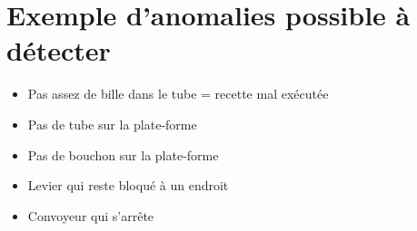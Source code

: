 \documentclass[12pt]{beamer}
\begin{document}
	\section{Exemple d'anomalies possible à détecter}
	\begin{frame}
	    \begin{block}{}
	        \begin{itemize}
	            [triangle]
	            \item Pas assez de bille dans le tube = recette mal exécutée
        	    \item Pas de tube sur la plate-forme
        	    \item Pas de bouchon sur la plate-forme
        	    \item Levier qui reste bloqué à un endroit
        	    \item Convoyeur qui s'arrête
	        \end{itemize}
	    \end{block}
	\end{frame}
\end{document}
